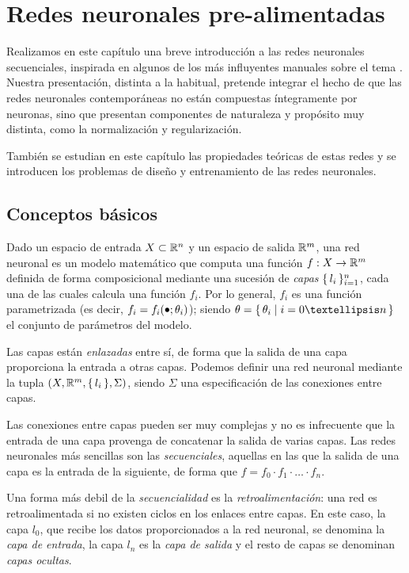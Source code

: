 \chapter{Redes neuronales pre-alimentadas}
Realizamos en este capítulo una breve introducción a las redes neuronales secuenciales, inspirada en algunos de los más influyentes manuales sobre el tema \cite{goodfellow2016deep, bishop2006pattern}. Nuestra presentación, distinta a la habitual, pretende integrar el hecho  de que las redes neuronales contemporáneas no están compuestas íntegramente por neuronas, sino que presentan componentes de naturaleza y propósito muy distinta, como la normalización y regularización. 

También se estudian en este capítulo las propiedades teóricas de estas redes y se introducen los problemas de diseño y entrenamiento de las redes neuronales.

\section{Conceptos básicos}
Dado un espacio de entrada \( X \subset \mathbb{R}^{n} \) y un espacio de salida \( \mathbb{R}^{m} \), una red neuronal es un modelo matemático que computa una función \( f: X \to \mathbb{R}^{m} \) definida de forma composicional mediante una sucesión de \textit{capas} \( \{\,l_{i}\,\}_{i=1}^n \), cada una de las cuales calcula una función \( f_{i} \). Por lo general, \( f_{i} \) es una función parametrizada (es decir, \( f_{i} = f_{i}(\mathord{\smallbullet}; \theta_i) \)); siendo \( \theta = \Set{\theta_i \mid i = 0 … n} \) el conjunto de parámetros del modelo.

Las capas están \textit{enlazadas} entre sí, de forma que la salida de una capa proporciona la entrada a otras capas. Podemos definir una red neuronal mediante la tupla \( (X, \mathbb{R}^{m}, \{\, l_i \,\}, \Sigma) \), siendo \( \Sigma \) una especificación de las conexiones entre capas.

Las conexiones entre capas pueden ser muy complejas y no es infrecuente que la entrada de una capa provenga de concatenar la salida de varias capas. Las redes neuronales más sencillas son las \textit{secuenciales}, aquellas en las que la salida de una capa es la entrada de la siguiente, de forma que \( f = f_{0} \cdot f_{1} \cdot … \cdot f_{n} \).

Una forma más debil de la \textit{secuencialidad} es la \textit{retroalimentación}: una red es retroalimentada si no existen ciclos en los enlaces entre capas. En este caso, la capa \( l_0 \), que recibe los datos proporcionados a la red neuronal, se denomina la \textit{capa de entrada}, la capa \( l_{n} \) es la \textit{capa de salida} y el resto de capas se denominan \textit{capas ocultas}.

